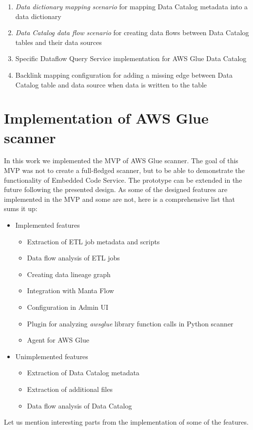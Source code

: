 \begin{enumerate}
    \item \textit{Data dictionary mapping scenario} for mapping Data Catalog metadata into a data dictionary
    \item \textit{Data Catalog data flow scenario} for creating data flows between Data Catalog tables and their data sources
    \item Specific Dataflow Query Service implementation for AWS Glue Data Catalog
    \item Backlink mapping configuration for adding a missing edge between Data Catalog table and data source when data is written to the table
\end{enumerate}

\section{Implementation of AWS Glue scanner}
In this work we implemented the MVP of AWS Glue scanner. The goal of this MVP was not to create a full-fledged scanner, but to be able to demonstrate the functionality of Embedded Code Service. The prototype can be extended in the future following the presented design. As some of the designed features are implemented in the MVP and some are not, here is a comprehensive list that sums it up:
\begin{itemize}
    \item Implemented features
    \begin{itemize}
        \item Extraction of ETL job metadata and scripts
        \item Data flow analysis of ETL jobs
        \item Creating data lineage graph
        \item Integration with Manta Flow
        \item Configuration in Admin UI
        \item Plugin for analyzing \textit{awsglue} library function calls in Python scanner
        \item Agent for AWS Glue
    \end{itemize}
    \item Unimplemented features
    \begin{itemize}
        \item Extraction of Data Catalog metadata
        \item Extraction of additional files
        \item Data flow analysis of Data Catalog    
    \end{itemize}
\end{itemize}
\par
Let us mention interesting parts from the implementation of some of the features.

